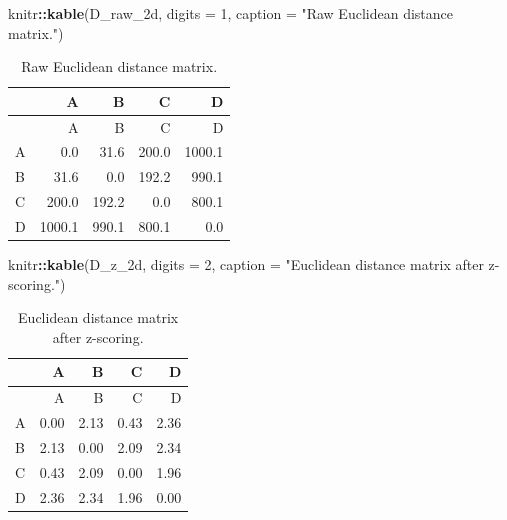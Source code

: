 \documentclass[
  english,
]{article}
\newenvironment{Shaded}{\begin{snugshade}}{\end{snugshade}}
\newcommand{\AttributeTok}[1]{\textcolor[rgb]{0.13,0.29,0.53}{#1}}
\newcommand{\DecValTok}[1]{\textcolor[rgb]{0.00,0.00,0.81}{#1}}
\newcommand{\FunctionTok}[1]{\textcolor[rgb]{0.13,0.29,0.53}{\textbf{#1}}}
\newcommand{\NormalTok}[1]{#1}
\newcommand{\SpecialCharTok}[1]{\textcolor[rgb]{0.81,0.36,0.00}{\textbf{#1}}}
\newcommand{\StringTok}[1]{\textcolor[rgb]{0.31,0.60,0.02}{#1}}
\begin{document}
\begin{Shaded}
\begin{Highlighting}[]
\NormalTok{knitr}\SpecialCharTok{::}\FunctionTok{kable}\NormalTok{(D\_raw\_2d, }\AttributeTok{digits =} \DecValTok{1}\NormalTok{, }\AttributeTok{caption =} \StringTok{"Raw Euclidean distance matrix."}\NormalTok{)}
\end{Highlighting}
\end{Shaded}

\begin{longtable}[]{@{}lrrrr@{}}
\caption{Raw Euclidean distance matrix.}\tabularnewline
\toprule\noalign{}
& A & B & C & D \\
\midrule\noalign{}
\endfirsthead
\toprule\noalign{}
& A & B & C & D \\
\midrule\noalign{}
\endhead
\bottomrule\noalign{}
\endlastfoot
A & 0.0 & 31.6 & 200.0 & 1000.1 \\
B & 31.6 & 0.0 & 192.2 & 990.1 \\
C & 200.0 & 192.2 & 0.0 & 800.1 \\
D & 1000.1 & 990.1 & 800.1 & 0.0 \\
\end{longtable}

\begin{Shaded}
\begin{Highlighting}[]
\NormalTok{knitr}\SpecialCharTok{::}\FunctionTok{kable}\NormalTok{(D\_z\_2d, }\AttributeTok{digits =} \DecValTok{2}\NormalTok{, }\AttributeTok{caption =} \StringTok{"Euclidean distance matrix after z{-}scoring."}\NormalTok{)}
\end{Highlighting}
\end{Shaded}

\begin{longtable}[]{@{}lrrrr@{}}
\caption{Euclidean distance matrix after z-scoring.}\tabularnewline
\toprule\noalign{}
& A & B & C & D \\
\midrule\noalign{}
\endfirsthead
\toprule\noalign{}
& A & B & C & D \\
\midrule\noalign{}
\endhead
\bottomrule\noalign{}
\endlastfoot
A & 0.00 & 2.13 & 0.43 & 2.36 \\
B & 2.13 & 0.00 & 2.09 & 2.34 \\
C & 0.43 & 2.09 & 0.00 & 1.96 \\
D & 2.36 & 2.34 & 1.96 & 0.00 \\
\end{longtable}
\end{document}
